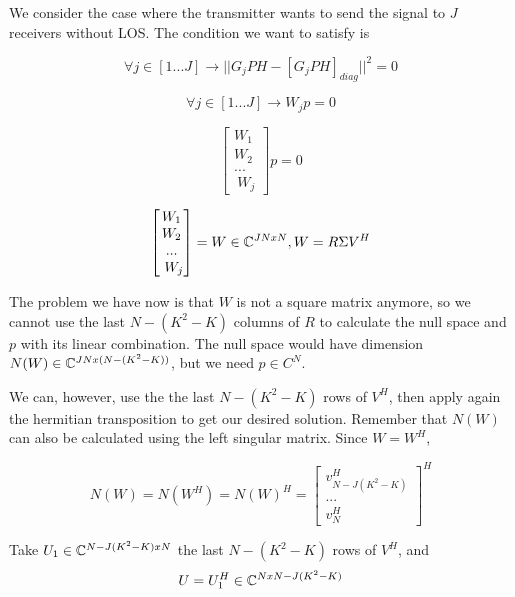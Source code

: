 We consider the case where the transmitter wants to send the signal to $J$ receivers without LOS. The condition we want to satisfy is

\begin{equation}
  \forall j \in [1...J] \rightarrow || G_jPH - [G_jPH]_{diag} || ^2 = 0
\end{equation}

\begin{equation}
  \forall j \in [1...J] \rightarrow W_jp = 0
\end{equation}

\begin{equation}
  \begin{bmatrix}
    W_1  \\
    W_ 2 \\
    ...  \\\
    W_j
  \end{bmatrix}
  p = 0
\end{equation}

\begin{equation}
  \begin{bmatrix}
    W_1  \\
    W_ 2 \\
    ...  \\\
    W_j
  \end{bmatrix}
  = W \in \mathbb{C} ^ {JNxN}, W = R \Sigma V^H
\end{equation}

The problem we have now is that $W$ is not a square matrix anymore, so we cannot use the last $N - (K^2 - K)$ columns of $R$ to calculate the null space and $p$ with its linear combination. The null space would have dimension $N(W) \in \mathbb{C}^{JN x (N - (K^2 - K))}$, but we need $p \in C^N$.

We can, however, use the the last $N - (K^2 - K)$ rows of $V^H$, then apply again the hermitian transposition to get our desired solution. Remember that $N(W)$ can also be calculated using the left singular matrix. Since $W = W^H$,

\begin{equation}
  N(W) = N(W^H) = N(W)^H = \begin{bmatrix} v^H_{N - J(K^2 - K)} \\ ... \\ v^H_N \end{bmatrix} ^ H
\end{equation}

Take $U_1 \in \mathbb{C} ^ {N - J(K^2 - K) x N}$ the last $N - (K^2 - K)$ rows of $V^H$, and
\begin{equation}
  U = U_1^H \in \mathbb{C} ^ {N x N - J(K^2 - K)}
\end{equation}

